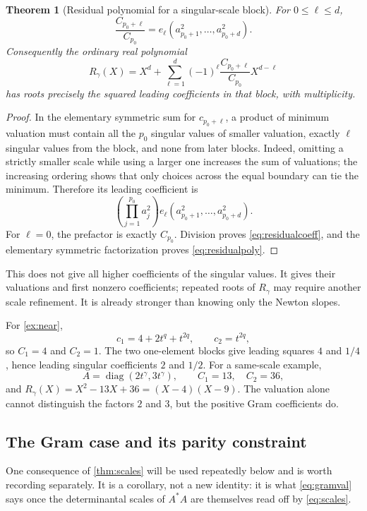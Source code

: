 \documentclass[11pt,a4paper]{article}
\numberwithin{equation}{section}
\newtheorem{theorem}{Theorem}[section]
\theoremstyle{definition}
\theoremstyle{remark}
\newcommand{\diag}{\operatorname{diag}}
\begin{document}
\begin{theorem}[Residual polynomial for a singular-scale block]\label{thm:residual}
For $0\le\ell\le d$,
\begin{equation}\label{eq:residualcoeff}
 \frac{C_{p_0+\ell}}{C_{p_0}}
   =e_\ell(a_{p_0+1}^2,\ldots,a_{p_0+d}^2).
\end{equation}
Consequently the ordinary real polynomial
\begin{equation}\label{eq:residualpoly}
 R_\gamma(X)=X^d+
   \sum_{\ell=1}^d(-1)^\ell\frac{C_{p_0+\ell}}{C_{p_0}}X^{d-\ell}
\end{equation}
has roots precisely the squared leading coefficients in that block,
with multiplicity.
\end{theorem}
\begin{proof}
In the elementary symmetric sum for $c_{p_0+\ell}$, a product of minimum
valuation must contain all the $p_0$ singular values of smaller valuation,
exactly $\ell$ singular values from the block, and none from later blocks.
Indeed, omitting a strictly smaller scale while using a larger one
increases the sum of valuations; the increasing ordering shows that only
choices across the equal boundary can tie the minimum. Therefore its
leading coefficient is
\[
 \left(\prod_{j=1}^{p_0}a_j^2\right)
 e_\ell(a_{p_0+1}^2,\ldots,a_{p_0+d}^2).
\]
For $\ell=0$, the prefactor is exactly $C_{p_0}$. Division proves
\eqref{eq:residualcoeff}, and the elementary symmetric factorization proves
\eqref{eq:residualpoly}.
\end{proof}

This does not give all higher coefficients of the singular values. It gives
their valuations and first nonzero coefficients; repeated roots of
$R_\gamma$ may require another scale refinement. It is already stronger than
knowing only the Newton slopes.

For \cref{ex:near},
\[
 c_1=4+2t^q+t^{2q},\qquad c_2=t^{2q},
\]
so $C_1=4$ and $C_2=1$. The two one-element blocks give leading squares
$4$ and $1/4$, hence leading singular coefficients $2$ and $1/2$.
For a same-scale example,
\[
 A=\diag(2t^\gamma,3t^\gamma),\qquad
 C_1=13,\quad C_2=36,
\]
and $R_\gamma(X)=X^2-13X+36=(X-4)(X-9)$. The valuation alone cannot
distinguish the factors $2$ and $3$, but the positive Gram coefficients do.

\subsection{The Gram case and its parity constraint}
One consequence of \cref{thm:scales} will be used repeatedly below and is
worth recording separately. It is a corollary, not a new identity: it is
what \eqref{eq:gramval} says once the determinantal scales of $A^*A$ are
themselves read off by \eqref{eq:scales}.
\end{document}
